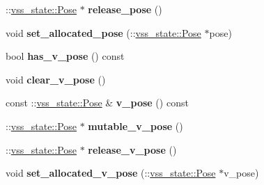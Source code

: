 \begin{DoxyCompactItemize}
\item 
\+::\hyperlink{classvss__state_1_1Pose}{vss\+\_\+state\+::\+Pose} $\ast$ {\bfseries release\+\_\+pose} ()\hypertarget{classvss__state_1_1Ball__State_a9a5aa9e491a204a03a7c50455e455892}{}\label{classvss__state_1_1Ball__State_a9a5aa9e491a204a03a7c50455e455892}

\item 
void {\bfseries set\+\_\+allocated\+\_\+pose} (\+::\hyperlink{classvss__state_1_1Pose}{vss\+\_\+state\+::\+Pose} $\ast$pose)\hypertarget{classvss__state_1_1Ball__State_a2bf1fa45ff9a17edf9116a5422fafc43}{}\label{classvss__state_1_1Ball__State_a2bf1fa45ff9a17edf9116a5422fafc43}

\item 
bool {\bfseries has\+\_\+v\+\_\+pose} () const \hypertarget{classvss__state_1_1Ball__State_a07ae64c42cc9e02e4dfbac72ffebf930}{}\label{classvss__state_1_1Ball__State_a07ae64c42cc9e02e4dfbac72ffebf930}

\item 
void {\bfseries clear\+\_\+v\+\_\+pose} ()\hypertarget{classvss__state_1_1Ball__State_a9ba97738218066dbf5ec163a0d5470ad}{}\label{classvss__state_1_1Ball__State_a9ba97738218066dbf5ec163a0d5470ad}

\item 
const \+::\hyperlink{classvss__state_1_1Pose}{vss\+\_\+state\+::\+Pose} \& {\bfseries v\+\_\+pose} () const \hypertarget{classvss__state_1_1Ball__State_a96bd044402758e810a78fd2a1e2a9c0c}{}\label{classvss__state_1_1Ball__State_a96bd044402758e810a78fd2a1e2a9c0c}

\item 
\+::\hyperlink{classvss__state_1_1Pose}{vss\+\_\+state\+::\+Pose} $\ast$ {\bfseries mutable\+\_\+v\+\_\+pose} ()\hypertarget{classvss__state_1_1Ball__State_a13b650e7cc6d2b306eb072522922df06}{}\label{classvss__state_1_1Ball__State_a13b650e7cc6d2b306eb072522922df06}

\item 
\+::\hyperlink{classvss__state_1_1Pose}{vss\+\_\+state\+::\+Pose} $\ast$ {\bfseries release\+\_\+v\+\_\+pose} ()\hypertarget{classvss__state_1_1Ball__State_a56eb1c3147c39d721705f2ebeb825e8b}{}\label{classvss__state_1_1Ball__State_a56eb1c3147c39d721705f2ebeb825e8b}

\item 
void {\bfseries set\+\_\+allocated\+\_\+v\+\_\+pose} (\+::\hyperlink{classvss__state_1_1Pose}{vss\+\_\+state\+::\+Pose} $\ast$v\+\_\+pose)\hypertarget{classvss__state_1_1Ball__State_aae94edb5b999518e21d7681a49a3ec50}{}\label{classvss__state_1_1Ball__State_aae94edb5b999518e21d7681a49a3ec50}


\end{DoxyCompactItemize}
